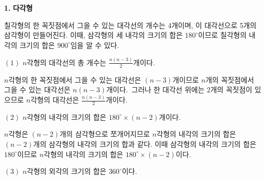 
\begin{flushleft}
    {\setmainfont[Path=FONT/]{KOPUBWORLD_DOTUM_PRO_BOLD.OTF} {\textcolor{skyblue2}{{\huge\textbf{1.}}}}}
    { {\textcolor{skyblue2}{{\huge\textbf{다각형}}}}}
\end{flushleft}

\begin{flushleft}
    칠각형의 한 꼭짓점에서 그을 수 있는 대각선의 개수는 4개이며, 
    이 대각선으로 5개의 삼각형이 만들어진다.
    이때, 삼각형의 세 내각의 크기의 합은 $180^{\circ}$이므로
    칠각형의 내각의 크기의 합은 $900^{\circ}$임을 알 수 있다. 
\end{flushleft}

\begin{flushleft}
    {$(1)$ $n$각형의 대각선의 총 개수는 $\frac{n(n-3)}{2}$개이다.}
\end{flushleft}

\begin{tcolorbox}[colback = white, colframe = blue!35!skyblue, title = \textmd{따름정리 (Corollary)}]
    $n$각형의 한 꼭짓점에서 그을 수 있는 대각선은 $(n-3)$개이므로
    $n$개의 꼭짓점에서 그을 수 있는 대각선은 $n(n-3)$개이다.
    \,그러나 한 대각선 위에는 $2$개의 꼭짓점이 있으므로 $n$각형의 대각선은
    $\frac{n(n-3)}{2}$개이다.
\end{tcolorbox}


\begin{flushleft}
    $(2)$ $n$각형의 내각의 크기의 합은 $180^{\circ} \times (n-2)$개이다.
\end{flushleft}

\begin{tcolorbox}[colback = white, colframe = blue!35!skyblue, title = \textmd{이해하기}]
    $n$각형은 $(n-2)$개의 삼각형으로 쪼개어지므로 $n$각형의 내각의 크기의 합은
    $(n-2)$개의 삼각형의 내각의 크기의 합과 같다. 이때 삼각형의 내각의 크기의 합은
    $180^{\circ}$이므로 $n$각형의 내각의 크기의 합은 $180^{\circ} \times (n-2)$이다.
\end{tcolorbox}

\begin{flushleft}
    $(3)$ $n$각형의 외각의 크기의 합은 $360^{\circ}$이다.
\end{flushleft}

